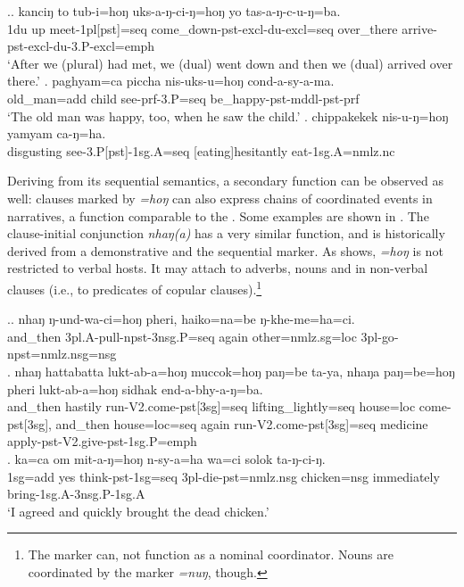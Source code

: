 \ex.\ag.	kanciŋ to tub-i=hoŋ uks-a-ŋ-ci-ŋ=hoŋ  yo tas-a-ŋ-c-u-ŋ=ba.\\
			{\sc 1du} up meet{\sc -1pl[pst]=seq}  come\_down-{\sc pst-excl-du-excl=seq}  over\_there arrive{\sc -pst-excl-du-3.P-excl=emph}\\
			‘After we (plural) had met, we (dual) went down and then we (dual) arrived over there.’ 
	\bg.	paghyam=ca piccha nis-uks-u=hoŋ cond-a-sy-a-ma.\\
			old\_man={\sc add} child  see{\sc -prf-3.P=seq}  be\_happy{\sc [3sg]-pst-mddl-pst-prf}\\
			‘The old man was happy, too, when he saw the child.’ 
	\bg.		chippakekek nis-u-ŋ=hoŋ yamyam ca-ŋ=ha.\\
	disgusting see{\sc -3.P[pst]-1sg.A=seq} [eating]hesitantly eat{\sc [pst]-1sg.A=nmlz.nc}\\
			
	
	
Deriving from its sequential semantics, a secondary function can be observed as well: clauses marked by \emph{=hoŋ} can also express chains of coordinated events in narratives, a function comparable to the  \citep{Nedjalkov1995Some}.  Some examples are shown in \Next. The clause-initial conjunction \emph{nhaŋ(a)} has a very similar function, and is historically derived from a demonstrative and the sequential marker. As \Next[b] shows, \emph{=hoŋ} is not restricted to verbal hosts. It may attach to adverbs, nouns and  in non-verbal clauses (i.e., to predicates of copular clauses).\footnote{The marker can, not function as a nominal coordinator. Nouns are coordinated by the  marker \emph{=nuŋ}, though.}

	\ex.\ag. nhaŋ    ŋ-und-wa-ci=hoŋ                   pheri, haiko=na=be           ŋ-khe-me=ha=ci.\\
		and\_then {\sc 3pl.A-}pull{\sc -npst-3nsg.P=seq} again other{\sc =nmlz.sg=loc} {\sc 3pl-}go{\sc -npst=nmlz.nsg=nsg}\\
		 
\bg. nhaŋ hattabatta   lukt-ab-a=hoŋ muccok=hoŋ paŋ=be ta-ya, nhaŋa    paŋ=be=hoŋ pheri lukt-ab-a=hoŋ sidhak end-a-bhy-a-ŋ=ba.\\
	and\_then hastily run{\sc -V2.come-pst[3sg]=seq} lifting\_lightly{\sc =seq} house{\sc =loc} come{\sc -pst[3sg]}, and\_then house{\sc =loc=seq}  again run{\sc -V2.come-pst[3sg]=seq}  medicine apply{\sc -pst-V2.give-pst-1sg.P=emph}\\
 
\bg.	ka=ca    om  mit-a-ŋ=hoŋ       n-sy-a=ha              wa=ci             solok       ta-ŋ-ci-ŋ.\\
		{\sc 1sg=add} yes think{\sc -pst-1sg=seq} {\sc 3pl-}die{\sc -pst=nmlz.nsg} chicken={\sc nsg} immediately bring{\sc [pst]-1sg.A-3nsg.P-1sg.A}\\
		‘I agreed and quickly brought the dead chicken.’ 
		

